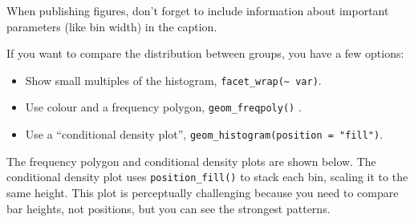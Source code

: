 When publishing figures, don't forget to include information about
important parameters (like bin width) in the caption.

If you want to compare the distribution between groups, you have a few
options:

\begin{itemize}
\tightlist
\item
  Show small multiples of the histogram,
  \texttt{facet\_wrap(\textasciitilde{}\ var)}.
\item
  Use colour and a frequency polygon, \texttt{geom\_freqpoly()} .
   
\item
  Use a ``conditional density plot'',
  \texttt{geom\_histogram(position\ =\ "fill")}.
\end{itemize}

The frequency polygon and conditional density plots are shown below. The
conditional density plot uses \texttt{position\_fill()} to stack each
bin, scaling it to the same height. This plot is perceptually
challenging because you need to compare bar heights, not positions, but
you can see the strongest patterns. 

\begin{Shaded}
\begin{Highlighting}[]
\StringTok{ }
\StringTok{  }\NormalTok{(}\NormalTok{(}  \NormalTok{) +}
\StringTok{  }\NormalTok{(}\NormalTok{, }\NormalTok{) +}\StringTok{ }
\StringTok{  }\NormalTok{(} \NormalTok{)}
\StringTok{ }
\StringTok{  }\NormalTok{(}\NormalTok{(}  \NormalTok{, } \NormalTok{) +}
\StringTok{  }\NormalTok{(}\NormalTok{, }\NormalTok{) +}\StringTok{ }
\StringTok{  }\NormalTok{(} \NormalTok{)}
\end{Highlighting}
\end{Shaded}

